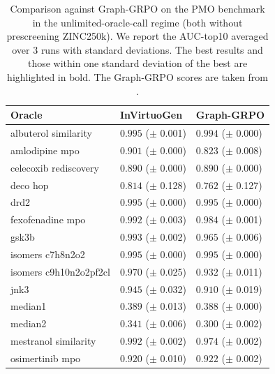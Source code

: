 \documentclass{article} %
\begin{document}
\begin{table}[ht]
\centering
\caption{Comparison against Graph-GRPO on the PMO benchmark in the unlimited-oracle-call regime (both without prescreening ZINC250k). We report the AUC-top10 averaged over 3 runs with standard deviations. The best results and those within one standard deviation of the best are highlighted in bold. The Graph-GRPO scores are taken from \citep{graphgrpo}.}
\label{tab:unlimited_no_prescreen}
\begin{tabularx}{\linewidth}{l|>{}p{2.2cm} Y }
\toprule
Oracle & InVirtuoGen & Graph-GRPO \\
\midrule
\small{albuterol similarity} & $\mathbf{0.995}$ {\tiny ($\pm$ 0.001)} & $0.994$ {\tiny ($\pm$ 0.000)} \\
\small{amlodipine mpo} & $\mathbf{0.901}$ {\tiny ($\pm$ 0.000)} & $0.823$ {\tiny ($\pm$ 0.008)} \\
\small{celecoxib rediscovery} & $\mathbf{0.890}$ {\tiny ($\pm$ 0.000)} & $\mathbf{0.890}$ {\tiny ($\pm$ 0.000)} \\
\small{deco hop} & $\mathbf{0.814}$ {\tiny ($\pm$ 0.128)} & $\mathbf{0.762}$ {\tiny ($\pm$ 0.127)} \\
\small{drd2} & $\mathbf{0.995}$ {\tiny ($\pm$ 0.000)} & $\mathbf{0.995}$ {\tiny ($\pm$ 0.000)} \\
\small{fexofenadine mpo} & $\mathbf{0.992}$ {\tiny ($\pm$ 0.003)} & $0.984$ {\tiny ($\pm$ 0.001)} \\
\small{gsk3b} & $\mathbf{0.993}$ {\tiny ($\pm$ 0.002)} & $0.965$ {\tiny ($\pm$ 0.006)} \\
\small{isomers c7h8n2o2} & $\mathbf{0.995}$ {\tiny ($\pm$ 0.000)} & $\mathbf{0.995}$ {\tiny ($\pm$ 0.000)} \\
\small{isomers c9h10n2o2pf2cl} & $\mathbf{0.970}$ {\tiny ($\pm$ 0.025)} & $0.932$ {\tiny ($\pm$ 0.011)} \\
\small{jnk3} & $\mathbf{0.945}$ {\tiny ($\pm$ 0.032)} & $0.910$ {\tiny ($\pm$ 0.019)} \\
\small{median1} & $\mathbf{0.389}$ {\tiny ($\pm$ 0.013)} & $\mathbf{0.388}$ {\tiny ($\pm$ 0.000)} \\
\small{median2} & $\mathbf{0.341}$ {\tiny ($\pm$ 0.006)} & $0.300$ {\tiny ($\pm$ 0.002)} \\
\small{mestranol similarity} & $\mathbf{0.992}$ {\tiny ($\pm$ 0.002)} & $0.974$ {\tiny ($\pm$ 0.002)} \\
\small{osimertinib mpo} & $\mathbf{0.920}$ {\tiny ($\pm$ 0.010)} & $\mathbf{0.922}$ {\tiny ($\pm$ 0.002)} \\

\end{tabularx}
\end{table}
\end{document}
